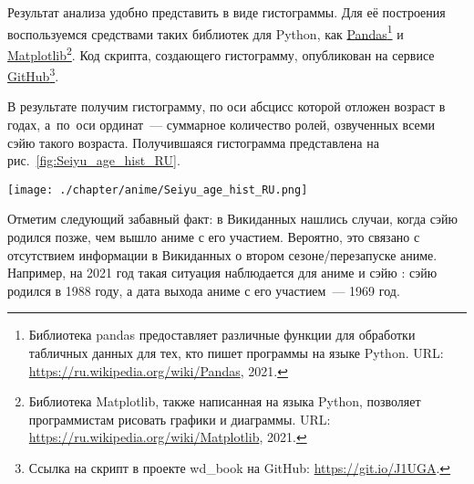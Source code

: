 \newpage
Результат анализа удобно представить в виде гистограммы. 
Для её построения воспользуемся средствами таких библиотек для Python, 
как \href{https://ru.wikipedia.org/wiki/Pandas}{Pandas}\footnote[][-\baselineskip]{%
%
    Библиотека pandas предоставляет различные функции для обработки табличных данных 
    для тех, кто пишет программы на языке Python. 
    URL: \href{https://ru.wikipedia.org/wiki/Pandas}{https://ru.wikipedia.org/wiki/Pandas}, 2021.%
%
} 
и \href{https://ru.wikipedia.org/wiki/Matplotlib}{Matplotlib}\footnote{%
%   
    Библиотека Matplotlib, также написанная на языка Python, 
    позволяет программистам рисовать графики и диаграммы. 
    URL: \href{https://ru.wikipedia.org/wiki/Matplotlib}{https://ru.wikipedia.org/wiki/Matplotlib}, 2021.%
%
}. Код скрипта, создающего гистограмму, 
опубликован на сервисе \href{https://git.io/J1UGA}{GitHub}\footnote{%
    Ссылка на скрипт в проекте wd\_book на GitHub: \href{https://git.io/J1UGA}{https://git.io/J1UGA}.%
}.


В результате получим гистограмму, по оси абсцисс которой отложен возраст в годах, 
а~по~оси ординат~--- суммарное количество ролей, озвученных всеми сэйю такого возраста. Получившаяся гистограмма представлена на рис.~\ref{fig:Seiyu_age_hist_RU}. 

\begin{figure*}[h!]
    \texttt{[image: ./chapter/anime/Seiyu\_age\_hist\_RU.png]}%
	\caption[Гистограмма с числом аниме, озвученных сэйю разных возрастов, 2021 года.]{Гистограмма с числом аниме, озвученных сэйю разных возрастов, 2021 год. Гистограмма построена на~основе данных, полученных с помощью запросов~\protect\ref{lst:seiyu_bd_w_service} (или~\protect\ref{lst:seiyu_bd_w_rdfs}), \protect\ref{lst:all_anime_releases} и \protect\ref{lst:link_anime_seiyu}.}%
    \label{fig:Seiyu_age_hist_RU}%
\end{figure*} 


\newpage
Отметим следующий забавный факт: в Викиданных нашлись случаи, когда сэйю родился позже, чем вышло аниме с его участием. Вероятно, это связано с отсутствием информации в Викиданных о втором сезоне/перезапуске аниме. Например, на 2021 год такая ситуация наблюдается для аниме  и сэйю : сэйю родился в 1988 году, а дата выхода аниме с его участием~--- 1969 год.


